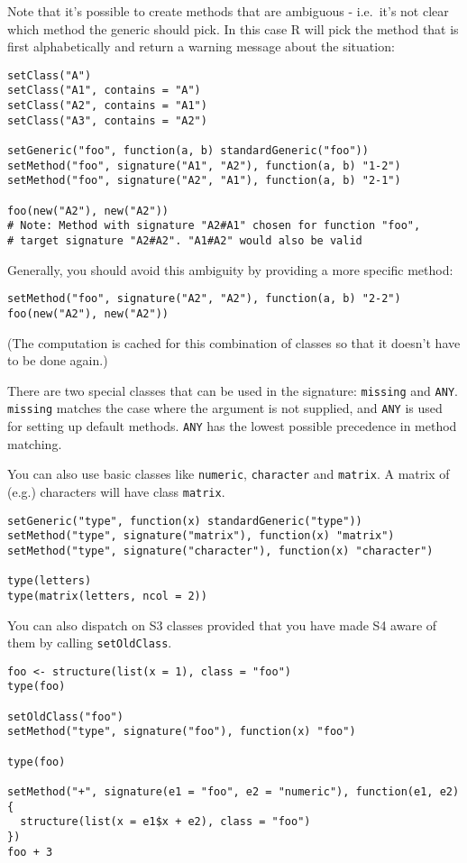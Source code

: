 Note that it's possible to create methods that are ambiguous - i.e.~it's
not clear which method the generic should pick. In this case R will pick
the method that is first alphabetically and return a warning message
about the situation:

\begin{verbatim}
setClass("A")
setClass("A1", contains = "A")
setClass("A2", contains = "A1")
setClass("A3", contains = "A2")

setGeneric("foo", function(a, b) standardGeneric("foo")) 
setMethod("foo", signature("A1", "A2"), function(a, b) "1-2")
setMethod("foo", signature("A2", "A1"), function(a, b) "2-1")

foo(new("A2"), new("A2"))
# Note: Method with signature "A2#A1" chosen for function "foo",
# target signature "A2#A2". "A1#A2" would also be valid
\end{verbatim}

Generally, you should avoid this ambiguity by providing a more specific
method:

\begin{verbatim}
setMethod("foo", signature("A2", "A2"), function(a, b) "2-2")
foo(new("A2"), new("A2"))
\end{verbatim}

(The computation is cached for this combination of classes so that it
doesn't have to be done again.)

There are two special classes that can be used in the signature:
\texttt{missing} and \texttt{ANY}. \texttt{missing} matches the case
where the argument is not supplied, and \texttt{ANY} is used for setting
up default methods. \texttt{ANY} has the lowest possible precedence in
method matching.

You can also use basic classes like \texttt{numeric}, \texttt{character}
and \texttt{matrix}. A matrix of (e.g.) characters will have class
\texttt{matrix}.

\begin{verbatim}
setGeneric("type", function(x) standardGeneric("type"))
setMethod("type", signature("matrix"), function(x) "matrix")
setMethod("type", signature("character"), function(x) "character")

type(letters)
type(matrix(letters, ncol = 2))
\end{verbatim}

You can also dispatch on S3 classes provided that you have made S4 aware
of them by calling \texttt{setOldClass}.

\begin{verbatim}
foo <- structure(list(x = 1), class = "foo")
type(foo)

setOldClass("foo")
setMethod("type", signature("foo"), function(x) "foo")

type(foo)

setMethod("+", signature(e1 = "foo", e2 = "numeric"), function(e1, e2) {
  structure(list(x = e1$x + e2), class = "foo")
})
foo + 3
\end{verbatim}

